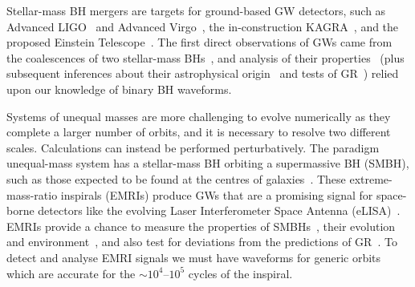 \documentclass[aps,prd,amsfonts,amssymb,amsmath,nofootinbib,showpacs,superscriptaddress,twocolumn,floatfix]{revtex4-1}
\begin{document}
Stellar-mass BH mergers are targets for ground-based GW detectors, such as Advanced LIGO~\cite{Aasi2015} and Advanced Virgo~\cite{Acernese2015}, the in-construction KAGRA~\cite{Aso2013}, and the proposed Einstein Telescope~\cite{Punturo2010a}. The first direct observations of GWs came from the coalescences of two stellar-mass BHs~\cite{Abbott2016,Abbott2016e,Abbott2016d}, and analysis of their properties~\cite{Abbott2016f,Abbott2016h,Abbott2016d} (plus subsequent inferences about their astrophysical origin~\cite{Abbott2016i,Abbott2016d} and tests of GR~\cite{Abbott2016j,Yunes2016,Abbott2016d}) relied upon our knowledge of binary BH waveforms. %

Systems of unequal masses are more challenging to evolve numerically as they complete a larger number of orbits, and it is necessary to resolve two different scales. Calculations can instead be performed perturbatively. The paradigm unequal-mass system has a stellar-mass BH orbiting a supermassive BH (SMBH), such as those expected to be found at the centres of galaxies~\cite{Kormendy1995,Ferrarese2005,Boehle2016}. These extreme-mass-ratio inspirals (EMRIs) produce GWs that are a promising signal for space-borne detectors like the evolving Laser Interferometer Space Antenna (eLISA)~\cite{Amaro-Seoane2007,Amaro-Seoane2012a}. EMRIs provide a chance to measure the properties of SMBHs~\cite{Barack2004,Arun2009}, their evolution~\cite{Gair2010b,Gair2010a} and environment~\cite{Yunes2011a,Barausse2014b}, and also test for deviations from the predictions of GR~\cite{Barack2007,Gair2012a}. To detect and analyse EMRI signals we must have waveforms for generic orbits which are accurate for the $\sim10^4$--$10^5$ cycles of the inspiral.
\end{document}
